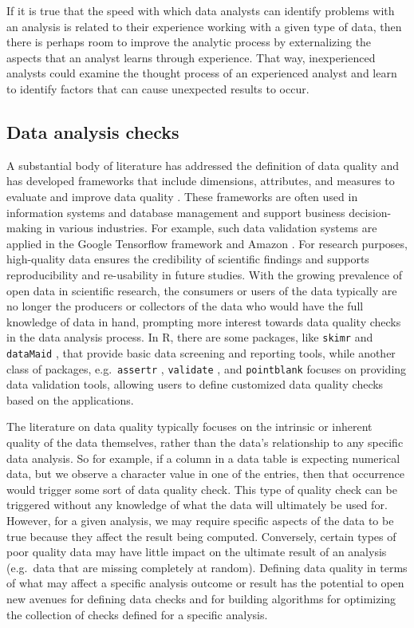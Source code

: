 \documentclass[
  12pt,
]{interact}
\begin{document}
If it is true that the speed with which data analysts can identify
problems with an analysis is related to their experience working with a
given type of data, then there is perhaps room to improve the analytic
process by externalizing the aspects that an analyst learns through
experience. That way, inexperienced analysts could examine the thought
process of an experienced analyst and learn to identify factors that can
cause unexpected results to occur.

\subsection{Data analysis checks}\label{data-analysis-checks}

A substantial body of literature has addressed the definition of data
quality and has developed frameworks that include dimensions,
attributes, and measures to evaluate and improve data quality
\citep{8642813, batini2009methodologies, cai2015challenges, wang1996beyond, 6204995, woodall2014classification}.
These frameworks are often used in information systems and database
management and support business decision-making in various industries.
For example, such data validation systems are applied in the Google
Tensorflow framework \citep{polyzotis2019data} and Amazon
\citep{schelter2018automating}. For research purposes, high-quality data
ensures the credibility of scientific findings and supports
reproducibility and re-usability in future studies. With the growing
prevalence of open data in scientific research, the consumers or users
of the data typically are no longer the producers or collectors of the
data who would have the full knowledge of data in hand, prompting more
interest towards data quality checks in the data analysis process. In R,
there are some packages, like \texttt{skimr} \citep{skimr} and
\texttt{dataMaid} \citep{dataMaid}, that provide basic data screening
and reporting tools, while another class of packages,
e.g.~\texttt{assertr} \citep{assertr}, \texttt{validate}
\citep{validate}, and \texttt{pointblank} \citep{pointblank} focuses on
providing data validation tools, allowing users to define customized
data quality checks based on the applications.

The literature on data quality typically focuses on the intrinsic or
inherent quality of the data themselves, rather than the data's
relationship to any specific data analysis. So for example, if a column
in a data table is expecting numerical data, but we observe a character
value in one of the entries, then that occurrence would trigger some
sort of data quality check. This type of quality check can be triggered
without any knowledge of what the data will ultimately be used for.
However, for a given analysis, we may require specific aspects of the
data to be true because they affect the result being computed.
Conversely, certain types of poor quality data may have little impact on
the ultimate result of an analysis (e.g.~data that are missing
completely at random). Defining data quality in terms of what may affect
a specific analysis outcome or result has the potential to open new
avenues for defining data checks and for building algorithms for
optimizing the collection of checks defined for a specific analysis.
\end{document}
